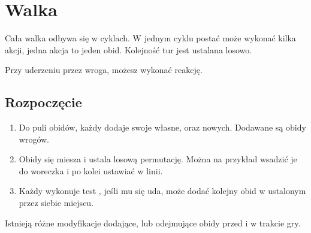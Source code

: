 \chapter{Walka}

Cała walka odbywa się w cyklach.
W jednym cyklu postać może wykonać kilka akcji, jedna akcja to jeden obid.
Kolejność tur jest ustalana losowo.

Przy uderzeniu przez wroga, możesz wykonać reakcję.

\section{Rozpoczęcie}
\begin{enumerate}
	\item Do puli obidów, każdy dodaje swoje własne, oraz \dvi{} nowych. Dodawane są obidy wrogów.
	\item Obidy się miesza i ustala losową permutację. Można na przykład wsadzić je do woreczka i po kolei ustawiać w linii.
	\item Każdy wykonuje test \abp{}, jeśli mu się uda, może dodać kolejny obid w ustalonym przez siebie miejscu.
\end{enumerate}
Istnieją różne modyfikacje dodające, lub odejmujące obidy przed i w trakcie gry.

